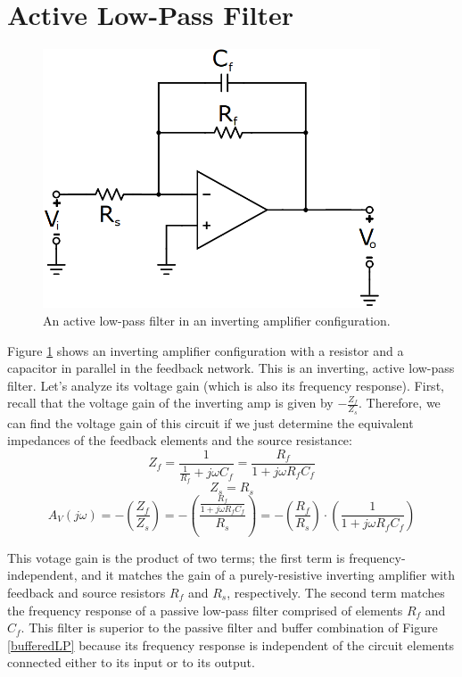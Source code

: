 \section{Active Low-Pass Filter}
\begin{figure}[h!]
\centering
\includegraphics[width=10cm]{figures/activeLP.png}
\caption{An active low-pass filter in an inverting amplifier configuration.}
\label{activeLP}
\end{figure}
Figure \ref{activeLP} shows an inverting amplifier configuration with a resistor and a capacitor in parallel in the feedback network. This is an inverting, active low-pass filter. Let's analyze its voltage gain (which is also its frequency response). First, recall that the voltage gain of the inverting amp is given by $-\frac{Z_f}{Z_s}$. Therefore, we can find the voltage gain of this circuit if we just determine the equivalent impedances of the feedback elements and the source resistance:
$$
Z_f = \frac{1}{\frac{1}{R_f}+j\omega C_f}=\frac{R_f}{1+j\omega R_fC_f}
$$
$$
Z_s = R_s
$$
$$
A_V(j \omega) = -\left(\frac{Z_f}{Z_s}\right) = -\left(\frac{\frac{R_f}{1+j\omega R_fC_f}}{R_s}\right) = -\left(\frac{R_f}{R_s}\right)\cdot\left(\frac{1}{1+j\omega R_fC_f}\right)
$$
\par
This votage gain is the product of two terms; the first term is frequency-independent, and it matches the gain of a purely-resistive inverting amplifier with feedback and source resistors $R_f$ and $R_s$, respectively. The second term matches the frequency response of a passive low-pass filter comprised of elements $R_f$ and $C_f$. This filter is superior to the passive filter and buffer combination of Figure \ref{bufferedLP} because its frequency response is independent of the circuit elements connected either to its input or to its output.
